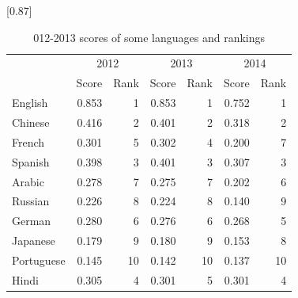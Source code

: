 \begin{table}[H]
	\centering
	\caption{012-2013 scores of some languages and rankings}
	 \scalebox{0.87}[0.87]{%
	\begin{tabular}{|p{4.11em}|r|r|r|r|r|r|}
		\toprule
		\multicolumn{1}{|c|}{\multirow{2}[4]{*}{\backslashbox[0pt][l]{Language}{Time}}} & \multicolumn{2}{c}{2012} & \multicolumn{2}{c}{2013} & \multicolumn{2}{c|}{2014} \\
		\cmidrule{2-7}    \multicolumn{1}{|c|}{} & \multicolumn{1}{p{4.11em}|}{Score} & \multicolumn{1}{p{4.11em}|}{Rank} & \multicolumn{1}{p{4.055em}|}{Score} & \multicolumn{1}{p{4.055em}|}{Rank} & \multicolumn{1}{p{4.055em}|}{Score} & \multicolumn{1}{p{4.055em}|}{Rank} \\
    \midrule
	English & 0.853  & 1     & 0.853  & 1     & 0.752  & 1 \\
	\midrule
	Chinese & 0.416  & 2     & 0.401  & 2     & 0.318  & 2 \\
	\midrule
	French & 0.301  & 5     & 0.302  & 4     & 0.200  & 7 \\
	\midrule
	Spanish & 0.398  & 3     & 0.401  & 3     & 0.307  & 3 \\
	\midrule
	Arabic & 0.278  & 7     & 0.275  & 7     & 0.202  & 6 \\
	\midrule
	Russian & 0.226  & 8     & 0.224  & 8     & 0.140  & 9 \\
	\midrule
	German & 0.280  & 6     & 0.276  & 6     & 0.268  & 5 \\
	\midrule
	Japanese & 0.179  & 9     & 0.180  & 9     & 0.153  & 8 \\
	\midrule
	Portuguese & 0.145  & 10    & 0.142  & 10    & 0.137  & 10 \\
	\midrule
	Hindi & 0.305  & 4     & 0.301  & 5     & 0.301  & 4 \\
	\bottomrule
	\end{tabular}%
}
	\label{tab:012}%
\end{table}%




